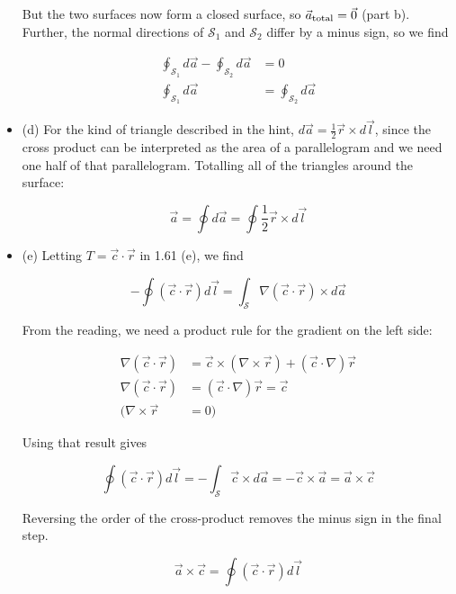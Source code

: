 \documentclass[10pt]{article}
\begin{document}
\begin{itemize}
But the two surfaces now form a closed surface, so $\vec{a}_{\rm total} = \vec{0}$ (part b).  Further, the normal directions of $\mathcal{S}_1$ and $\mathcal{S}_2$ differ by a minus sign, so we find

\begin{align}
\oint_{\mathcal{S}_1} d\vec{a} - \oint_{\mathcal{S}_2} d\vec{a} &= 0 \\
\oint_{\mathcal{S}_1} d\vec{a} &= \oint_{\mathcal{S}_2} d\vec{a}
\end{align}

\item (d) For the kind of triangle described in the hint, $d\vec{a} = \frac{1}{2}\vec{r} \times d\vec{l}$, since the cross product can be interpreted as the area of a parallelogram and we need one half of that parallelogram.  Totalling all of the triangles around the surface:

\begin{equation}
\vec{a} = \oint d\vec{a} = \oint \frac{1}{2}\vec{r} \times d\vec{l}
\end{equation}

\item (e) Letting $T = \vec{c} \cdot \vec{r}$ in 1.61 (e), we find

\begin{equation}
- \oint (\vec{c} \cdot \vec{r}) d\vec{l} =  \int_{\mathcal{S}} \nabla (\vec{c} \cdot \vec{r}) \times d\vec{a}
\end{equation}

From the reading, we need a product rule for the gradient on the left side:

\begin{align}
\nabla (\vec{c} \cdot \vec{r}) &= \vec{c} \times (\nabla \times \vec{r}) + (\vec{c} \cdot \nabla)\vec{r} \\
\nabla (\vec{c} \cdot \vec{r}) &= (\vec{c} \cdot \nabla)\vec{r} = \vec{c} \\
(\nabla \times \vec{r} &= 0)
\end{align}

Using that result gives

\begin{equation}
\oint (\vec{c} \cdot \vec{r}) d\vec{l} =  -\int_{\mathcal{S}} \vec{c} \times d\vec{a} = - \vec{c} \times \vec{a} = \vec{a} \times \vec{c}
\end{equation}

Reversing the order of the cross-product removes the minus sign in the final step.

\begin{equation}
\vec{a} \times \vec{c} = \oint (\vec{c} \cdot \vec{r}) d\vec{l}
\end{equation}
\end{itemize}
\end{document}
